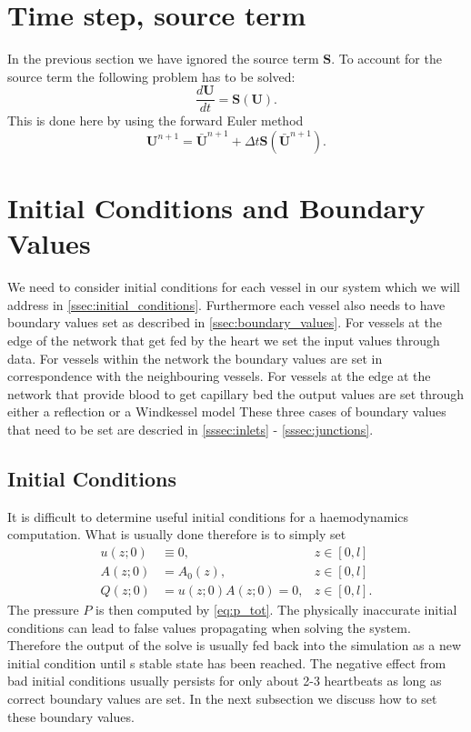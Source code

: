 \documentclass[a4paper, oneside]{discothesis}
\begin{document}
	\section{Time step, source term} \label{sec:fe}
	In the previous section we have ignored the source term $\mathbf{S}$.
	To account for the source term the following problem has to be solved:
	\begin{equation}
		\frac{d \mathbf{U}}{d t}=\mathbf{S}(\mathbf{U}) .
	\end{equation}
	This is done here by using the forward Euler method \cite{köppl2023dimension}
	\begin{equation}
		\mathbf{U}^{n+1}=\bar{\mathbf{U}}^{n+1} + \Delta t \mathbf{S}\left(\bar{\mathbf{U}}^{n+1}\right).
	\end{equation}



	\section{Initial Conditions and Boundary Values} \label{sec:icbc}
	We need to consider initial conditions for each vessel in our system which we will address in \autoref{ssec:initial_conditions}.
	Furthermore each vessel also needs to have boundary values set as described in \autoref{ssec:boundary_values}.
	For vessels at the edge of the network that get fed by the heart we set the input values through data.
	For vessels within the network the boundary values are set in correspondence with the neighbouring vessels.
	For vessels at the edge at the network that provide blood to get capillary bed the output values are set through either a reflection or a Windkessel model
	These three cases of boundary values that need to be set are descried in \autoref{sssec:inlets} - \autoref{sssec:junctions}.
	\subsection{Initial Conditions} \label{ssec:initial_conditions}
	It is difficult to determine useful initial conditions for a haemodynamics computation.
	What is usually done therefore is to simply set
	\begin{align}
		u(z;0) &\equiv 0, &z \in [0,l]\\
		A(z;0) &= A_0(z), &z \in [0,l] \\
		Q(z;0) &= u(z;0)A(z;0) = 0, &z \in [0,l].
	\end{align}
	The pressure $P$ is then computed by \autoref{eq:p_tot}.
	The physically inaccurate initial conditions can lead to false values propagating when solving the system.
	Therefore the output of the solve is usually fed back into the simulation as a new initial condition until s stable state has been reached.
	The negative effect from bad initial conditions usually persists for only about 2-3 heartbeats as long as correct boundary values are set.\cite{formaggia2010cardiovascular}
	In the next subsection we discuss how to set these boundary values. 
\end{document}
